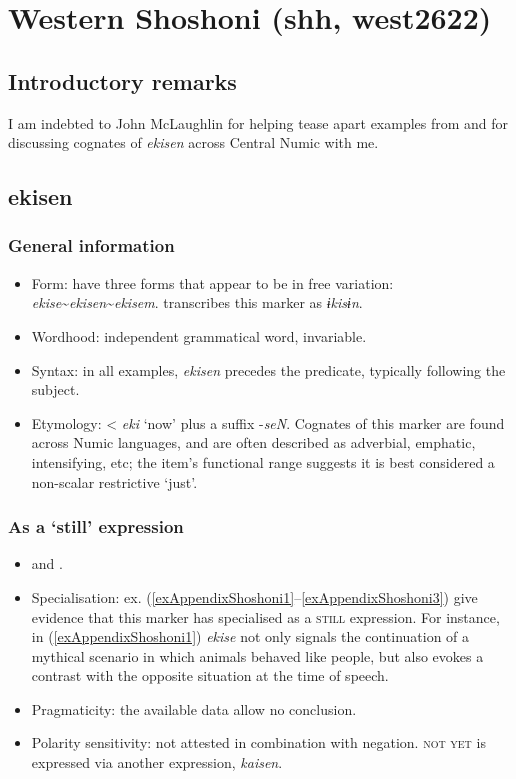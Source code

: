 \section{Western Shoshoni (shh, west2622)}
\label{appendixShoshoni}
\subsection{Introductory remarks}
I am indebted to John McLaughlin for helping tease apart examples from \textcite{CrumDayley1993} and for discussing cognates of \textit{ekisen} across Central Numic with me.

\subsection{ekisen}

\subsubsection{General information}
\begin{itemize}
	\item Form: \textcite{CrumDayley1993} have three forms that appear to be in free variation: \mbox{\textit{ekise}}\sim \mbox{\textit{ekisen}}\sim\mbox{\textit{ekisem}}. \textcite{McLaughlin2012} transcribes this marker as \mbox{\textit{ɨkisɨn}}.
	\item Wordhood: independent grammatical word, invariable.
	\item Syntax: in all examples, \textit{ekisen} precedes the predicate, typically following the subject.
	\item Etymology: < \textit{eki} \lq now' plus a suffix \mbox{-\textit{seN}}. Cognates of this marker are found across Numic languages, and are often described as adverbial, emphatic, intensifying, etc; the item's functional range suggests it is best considered a non-scalar restrictive \lq just\rq{}.
\end{itemize}

\subsubsection{As a \lq{}still\rq{ }expression}
\begin{itemize}
	\item \textcite[149]{CrumDayley1993} and \textcite[21]{McLaughlin2012}.
	\item Specialisation: ex. (\ref{exAppendixShoshoni1}–\ref{exAppendixShoshoni3}) give evidence that this marker has specialised as a \textsc{still} expression. For instance, in (\ref{exAppendixShoshoni1}) \textit{ekise} not only signals the continuation of a mythical scenario in which animals behaved like people, but also evokes a contrast with the opposite situation at the time of speech.
	\item Pragmaticity: the available data allow no conclusion.
	\item Polarity sensitivity: not attested in combination with negation. \textsc{not yet} is expressed via another expression, \textit{kaisen}.
\end{itemize}

